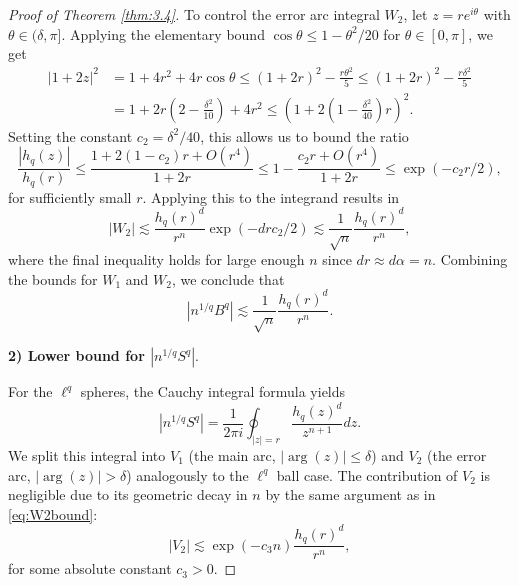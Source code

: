 \documentclass[a4paper,twoside, reqno]{amsart}
\numberwithin{equation}{section}
\theoremstyle{definition}%
\theoremstyle{definition}
\theoremstyle{definition}%
\theoremstyle{definition}
\begin{document}
\begin{proof}[Proof of Theorem \ref{thm:3.4}]
To control the error arc integral $W_2$, let $z = r e^{i\theta}$ with $\theta \in (\delta, \pi]$. Applying the elementary bound $\cos \theta \leq 1 - \theta^2/20$ for $\theta \in [0, \pi]$, we get
\begin{align*}
    |1+2z|^2 &= 1 + 4r^2 + 4r \cos \theta \leq (1+2r)^2 - \frac{r\theta^2}{5} 
    \leq (1+2r)^2 - \frac{r\delta^2}{5} \\
    &= 1 + 2r\left(2 - \frac{\delta^2}{10}\right) + 4r^2 
    \leq \left(1 + 2\left(1 - \frac{\delta^2}{40}\right)r\right)^2.
\end{align*}
Setting the constant $c_2 = \delta^2/40$, this allows us to bound the ratio
\[
    \frac{|h_q(z)|}{h_q(r)} \leq \frac{1 + 2(1-c_2)r + O(r^4)}{1+2r} \leq 1 - \frac{c_2 r + O(r^4)}{1+2r} \leq \exp(-c_2 r / 2),
\]
for sufficiently small $r$. 
Applying this to the integrand results in 
\begin{equation} \label{eq:W2bound}
    |W_2| \lesssim \frac{h_q(r)^d}{r^n} \exp(-d r c_2 / 2) \lesssim \frac{1}{\sqrt{n}} \frac{h_q(r)^d}{r^n},
\end{equation}
where the final inequality holds for large enough $n$ since $dr \approx d\alpha = n$. 
Combining the bounds for $W_1$ and $W_2$, we conclude that
\begin{equation} \label{eq:snBabo}
    |n^{1/q}B^q| \lesssim \frac{1}{\sqrt{n}} \frac{h_q(r)^d}{r^n}.
\end{equation}

\vspace{0.5cm}
\noindent \textbf{2) Lower bound for $|n^{1/q}S^q|$}. 

For the $\ell^q$ spheres, the Cauchy integral formula yields
\[
    |n^{1/q}S^q| = \frac{1}{2 \pi i} \oint_{|z|=r} \frac{h_q(z)^d}{z^{n+1}} dz.
\]
We split this integral into $V_1$ (the main arc, $|\arg(z)| \leq \delta$) and $V_2$ (the error arc, $|\arg(z)| > \delta$) analogously to the $\ell^q$ ball case. 
The contribution of $V_2$ is negligible due to its geometric decay in $n$ by the same argument as in \eqref{eq:W2bound}:
\begin{equation} \label{eq:V2ab}
    |V_2| \lesssim \exp(-c_3 n) \frac{h_q(r)^d}{r^n},
\end{equation}
for some absolute constant $c_3 > 0$.


\end{proof}
\end{document}
